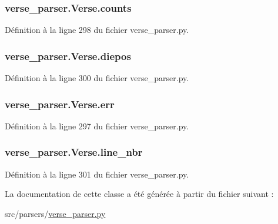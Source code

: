 \hypertarget{classverse__parser_1_1_verse_a8553bca345c6d0e5ffb9da1367f7fcfc}{}
\subsubsection[{counts}]{\setlength{\rightskip}{0pt plus 5cm}verse\+\_\+parser.\+Verse.\+counts}\label{classverse__parser_1_1_verse_a8553bca345c6d0e5ffb9da1367f7fcfc}


Définition à la ligne 298 du fichier verse\+\_\+parser.\+py.

\hypertarget{classverse__parser_1_1_verse_a5227bfe71e85077a51471157a8693c37}{}
\subsubsection[{diepos}]{\setlength{\rightskip}{0pt plus 5cm}verse\+\_\+parser.\+Verse.\+diepos}\label{classverse__parser_1_1_verse_a5227bfe71e85077a51471157a8693c37}


Définition à la ligne 300 du fichier verse\+\_\+parser.\+py.

\hypertarget{classverse__parser_1_1_verse_a8da23437b64c64b33f4d9415678a1934}{}
\subsubsection[{err}]{\setlength{\rightskip}{0pt plus 5cm}verse\+\_\+parser.\+Verse.\+err}\label{classverse__parser_1_1_verse_a8da23437b64c64b33f4d9415678a1934}


Définition à la ligne 297 du fichier verse\+\_\+parser.\+py.

\hypertarget{classverse__parser_1_1_verse_affbfce8897c2deb023524050b3fe5a83}{}
\subsubsection[{line\+\_\+nbr}]{\setlength{\rightskip}{0pt plus 5cm}verse\+\_\+parser.\+Verse.\+line\+\_\+nbr}\label{classverse__parser_1_1_verse_affbfce8897c2deb023524050b3fe5a83}


Définition à la ligne 301 du fichier verse\+\_\+parser.\+py.



La documentation de cette classe a été générée à partir du fichier suivant \+:\begin{DoxyCompactItemize}
\item 
src/parsers/\hyperlink{verse__parser_8py}{verse\+\_\+parser.\+py}\end{DoxyCompactItemize}
